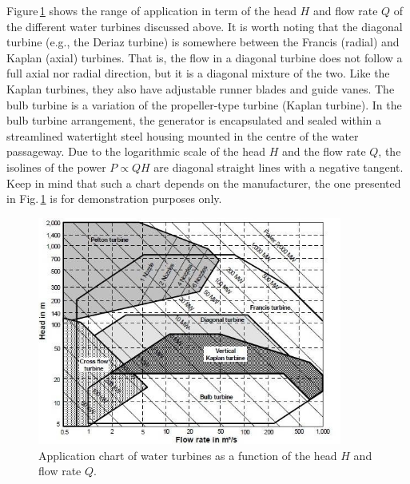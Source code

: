 Figure\,\ref{Fig:water_turbines_application_chart} shows the range of application in term of the head $H$ and flow rate $Q$ of the different water turbines discussed above. It is worth noting that the diagonal turbine (e.g., the Deriaz turbine) is somewhere between the Francis (radial) and Kaplan (axial) turbines. That is, the flow in a diagonal turbine does not follow a full axial nor radial direction, but it is a diagonal mixture of the two. Like the Kaplan turbines, they also have adjustable runner blades and guide vanes. The bulb turbine is a variation of the propeller-type turbine (Kaplan turbine). In the bulb turbine arrangement, the generator is encapsulated and sealed within a streamlined watertight steel housing mounted in the centre of the water passageway. Due to the logarithmic scale of the head $H$ and the flow rate $Q$, the isolines of the power $P \propto QH$ are diagonal straight lines with a negative tangent. Keep in mind that such a chart depends on the manufacturer, the one presented in Fig.\,\ref{Fig:water_turbines_application_chart} is for demonstration purposes only.

\begin{figure}[ht!]
	\centering
		\includegraphics[width=10cm]{HydroAndWindPower/Figures/Water_Turbine_Chart.png}
	\caption{Application chart of water turbines as a function of the head $H$ and flow rate $Q$.}
	\label{Fig:water_turbines_application_chart}
\end{figure}

